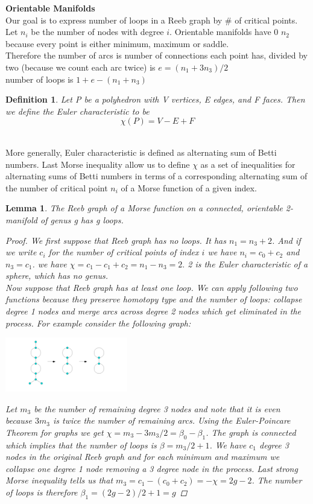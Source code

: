 \documentclass[]{article}
\newtheorem{lemma}{Lemma}
\newtheorem{definition}{Definition}
\begin{document}
\textbf{Orientable Manifolds} \\
Our goal is to express number of loops in a Reeb graph by # of critical points. Let $n_i$ be the number of nodes with degree $i$. Orientable manifolds have 0 $n_2$ because every point is either minimum, maximum or saddle.\\
Therefore the number of arcs is number of connections each point has, divided by two (because we count each arc twice) is $e = (n_1+3n_3)/2$ \\ 
number of loops is $1+e-(n_1+n_3)$
\begin{definition}
    Let P be a polyhedron with V vertices, E edges, and F faces. Then we define the Euler characteristic to be 
    \begin{equation}
        \chi(P) = V - E + F  
    \end{equation}
\end{definition} \\
More generally, Euler characteristic is defined as alternating sum of Betti numbers. Last Morse inequality allow us to define $\chi$ as a set of inequalities for alternating sums of Betti numbers in terms of a corresponding alternating sum of the number of critical point $n_i$ of a Morse function of a given index.
\begin{lemma}
    The Reeb graph of a Morse function on a connected, orientable 2-manifold of genus g has g loops.
    \begin{proof}
        We first suppose that Reeb graph has no loops. It has $n_1 = n_3+2$. And if we write $c_i$ for the number of critical points of index $i$ we have $n_i = c_0+c_2$ and $n_3 = c_1$. we have $\chi = c_1 - c_1 +c_2 = n_1 - n_3 = 2.$  2 is the Euler characteristic of a sphere, which has no genus. \\ 
        Now suppose that Reeb graph has at least one loop. We can apply following two functions because they preserve homotopy type and the number of loops: collapse degree 1 nodes and merge arcs across degree 2 nodes which get eliminated in the process. For example consider the following graph:
    \begin{center}
    \includegraphics[width=0.4\textwidth]{homotopic_transformation.png}
    \end{center}
    Let $m_3$ be the number of remaining degree 3 nodes and note that it is even because $3m_3$ is twice the number of remaining arcs. Using the Euler-Poincare Theorem for graphs we get $\chi = m_3 - 3m_3/2 = \beta_0 - \beta_1$. The graph is connected which implies that the number of loops is $\beta = m_3/2+1$. We have $c_1$ degree 3 nodes in the original Reeb graph and for each minimum and maximum we collapse one degree 1 node removing a 3 degree node in the process. Last strong Morse inequality tells us that $m_3 = c_1 - (c_0 + c_2) = -\chi = 2g - 2$. The number of loops is therefore $ \beta_1 = (2g-2)/2+1=g$
    \end{proof}
\end{lemma}
\end{document}
